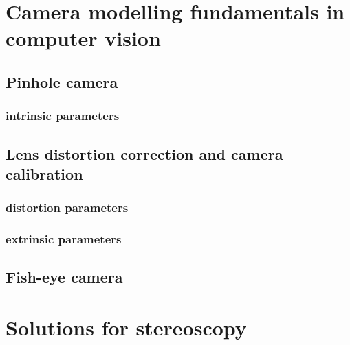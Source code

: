 

\section{Camera modelling fundamentals in computer vision}

\subsection{Pinhole camera}
\subsubsection{intrinsic parameters}

\subsection{Lens distortion correction and camera calibration}
\subsubsection{distortion parameters}
\subsubsection{extrinsic parameters}

\subsection{Fish-eye camera}


\section{Solutions for stereoscopy}

